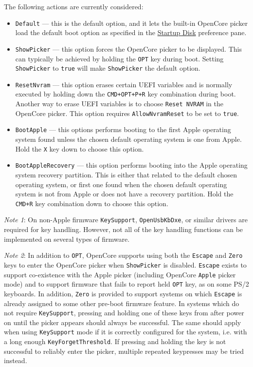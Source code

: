 \documentclass[]{article}
\providecommand{\tightlist}{%
  \setlength{\itemsep}{0pt}\setlength{\parskip}{0pt}}
\begin{document}
\begin{enumerate}
  The following actions are currently considered:

  \begin{itemize}
  \tightlist
  \item \texttt{Default} --- this is the default option, and it lets the built-in OpenCore
  picker load the default boot option as specified in the
  \href{https://support.apple.com/HT202796}{Startup Disk} preference pane.
  \item \texttt{ShowPicker} --- this option forces the OpenCore picker to be displayed. This can
  typically be achieved by holding the \texttt{OPT} key during boot. Setting \texttt{ShowPicker} to
  \texttt{true} will make \texttt{ShowPicker} the default option.
  \item \texttt{ResetNvram} --- this option erases certain UEFI variables and is
  normally executed by holding down the \texttt{CMD+OPT+P+R} key combination during boot.
  Another way to erase UEFI variables is to choose \texttt{Reset NVRAM} in the OpenCore picker.
  This option requires \texttt{AllowNvramReset} to be set to \texttt{true}.
  \item \texttt{BootApple} --- this options performs booting to the first Apple
  operating system found unless the chosen default operating system is one from Apple.
  Hold the \texttt{X} key down to choose this option.
  \item \texttt{BootAppleRecovery} --- this option performs booting into the Apple operating
  system recovery partition. This is either that related to the default chosen operating system,
  or first one found when the chosen default operating system is not from Apple or does not have
  a recovery partition. Hold the \texttt{CMD+R} key combination down to choose this option.
  \end{itemize}

  \emph{Note 1}: On non-Apple firmware \texttt{KeySupport}, \texttt{OpenUsbKbDxe}, or similar drivers are
  required for key handling. However, not all of the key handling functions can be implemented on several
  types of firmware.

  \emph{Note 2}: In addition to \texttt{OPT}, OpenCore supports using both the \texttt{Escape}
  and \texttt{Zero} keys to enter the OpenCore picker when \texttt{ShowPicker} is disabled.
  \texttt{Escape} exists to support co-existence with the Apple picker (including OpenCore \texttt{Apple}
  picker mode) and to support firmware that fails to report held \texttt{OPT} key, as on some PS/2 keyboards.
  In addition, \texttt{Zero} is provided to support systems on which \texttt{Escape} is already assigned to
  some other pre-boot firmware feature. In systems which do not require \texttt{KeySupport}, pressing and
  holding one of these keys from after power on until the picker appears should always be successful. The
  same should apply when using \texttt{KeySupport} mode if it is correctly configured for the system, i.e.
  with a long enough \texttt{KeyForgetThreshold}. If pressing and holding the key is not successful to reliably
  enter the picker, multiple repeated keypresses may be tried instead.


\end{enumerate}
\end{document}
